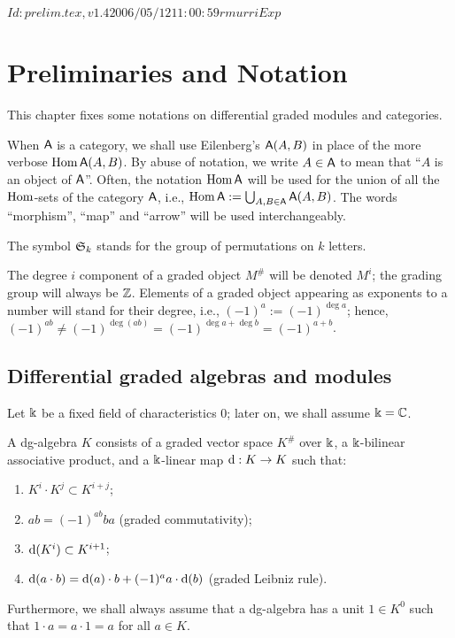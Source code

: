 \RCSID $Id: prelim.tex,v 1.4 2006/05/12 11:00:59 rmurri Exp $


\chapter{Preliminaries and Notation}

This chapter fixes some notations on differential graded modules
and categories.

When $\mathsf{A}$ is a category, we shall use Eilenberg's $\mathsf{A}(A, B)$ in place
of the more verbose $\operatorname{Hom} \mathsf{A}(A, B)$.  By abuse of notation, we write
$A \in \mathsf{A}$ to mean that ``$A$ is an object of $\mathsf{A}$''. Often, the
notation $\operatorname{Hom}\mathsf{A}$ will be used for the union of all the $\operatorname{Hom}$-sets of
the category $\mathsf{A}$, i.e., $\operatorname{Hom}\mathsf{A} := \bigcup_{A,B \in \mathsf{A}} \mathsf{A}(A,B)$.  The words
``morphism'', ``map'' and ``arrow'' will be used interchangeably.

The symbol $\mathfrak{S}_{k}$ stands for the group of permutations on $k$
letters.

The degree $i$ component of a graded object $M^\#$ will be denoted
$M^i$; the grading group will always be $\mathbb{Z}$. Elements of a graded
object appearing as exponents to a number will stand for their degree,
i.e., $(-1)^a := (-1)^{\deg a}$; hence, $(-1)^{ab} \not=
(-1)^{\deg (ab)} = (-1)^{\deg a + \deg b} = (-1)^{a+b}$.


\section{Differential graded algebras and modules}
\label{sec:dg-things}

Let $\Bbbk$ be a fixed field of characteristics $0$; later on, we shall
assume $\Bbbk = \mathbb{C}$.
\begin{definition}
  A dg-algebra $K$ consists of a graded vector space $K^\#$ over $\Bbbk$,
  a $\Bbbk$-bilinear associative product, and a $\Bbbk$-linear map $\mathrm{d}:
  K\to K$ such that:
  \begin{enumerate}
  \item $K^i \cdot K^j \subset K^{i+j}$;
  \item $ab = (-1)^{ab} ba$ (graded commutativity);
  \item $\mathrm{d}(K^i) \subset K^{i+1}$;
  \item $\mathrm{d}(a\cdot b) = \mathrm{d}(a)\cdot b + (-1)^a a\cdot\mathrm{d}(b)$ (graded Leibniz rule).
  \end{enumerate}
  Furthermore, we shall always assume that a dg-algebra has a unit
  $1\in K^0$ such that $1\cdot a = a\cdot 1 = a$ for all $a\in
  K$.
\end{definition}

